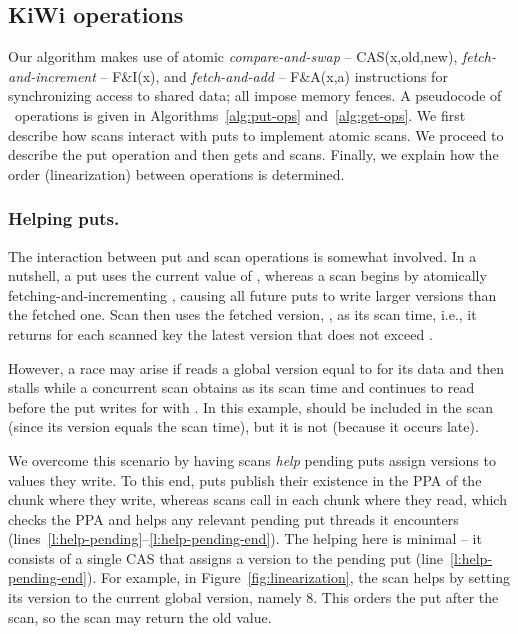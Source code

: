 \subsection{KiWi operations}
\label{sec:ops}

Our algorithm makes use of atomic \emph{compare-and-swap} -- CAS(x,old,new),  \emph{fetch-and-increment} -- F\&I(x), and
\emph{fetch-and-add} -- F\&A(x,a) instructions for synchronizing access to shared data; all impose memory fences.
A pseudocode of \kiwi\ operations is given in Algorithms~\ref{alg:put-ops} and~\ref{alg:get-ops}.
We first describe how scans interact with puts to implement atomic scans. We proceed to describe the put operation and then gets and scans. Finally, we explain how the order (linearization) between operations is determined. 

\subsubsection{Helping puts.}

The interaction between put and scan operations is somewhat involved. In a nutshell, a put uses the current value of , whereas a scan begins by atomically fetching-and-incrementing , causing all future puts to write larger versions than the fetched one. Scan then uses the fetched version, , as its scan time, i.e., it returns for each scanned key the latest version that does not exceed .

However,  a race may arise if
   reads a global version equal to  for its data and then stalls while a concurrent scan obtains  as its scan time and continues to read  before the put writes  for  with  . In this example,  should be included in the scan (since its version equals the scan time), but it is not (because it occurs late).

We overcome this scenario by having scans \emph{help} pending puts assign versions to values they write. To this end, puts publish their existence in the PPA of the chunk where they write, whereas scans call  in each chunk where they read, which 
checks the PPA  and helps any relevant pending put threads it encounters (lines~\ref{l:help-pending}--\ref{l:help-pending-end}).
The helping here is minimal -- it consists of a single CAS that assigns a version to the pending put (line~\ref{l:help-pending-end}).
For example, in Figure~\ref{fig:linearization}, the scan helps  by setting its version to the current global version, namely $8$.
This orders the put after the scan, so the scan may return the old value.


